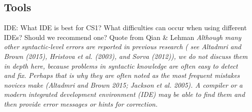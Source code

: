 \subsection{Tools}

IDE: What IDE is best for CS1? What difficulties can occur when using 
different IDEs? Should we recommend one? Quote from Qian \& Lehman \emph{
Although many other syntactic-level errors are reported in previous research (
see Altadmri and Brown (2015), Hristova et al. (2003), and Sorva (2012)), we 
do not discuss them in depth here, because problems in syntactic knowledge 
are often easy to detect and fix. Perhaps that is why they are often noted as 
the most frequent mistakes novices make (Altadmri and Brown 2015; Jackson et 
al. 2005). A compiler or a modern integrated development environment (IDE) 
may be able to find them and then provide error messages or hints for 
correction.}

